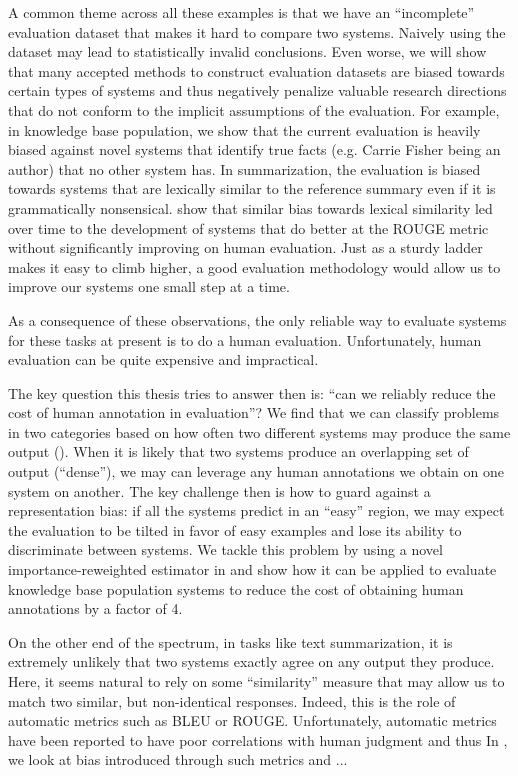 A common theme across all these examples is that we have an ``incomplete'' evaluation dataset that makes it hard to compare two systems.
Naively using the dataset may lead to statistically invalid conclusions.
Even worse, we will show that many accepted methods to construct evaluation datasets are biased towards certain types of systems and thus negatively penalize valuable research directions that do not conform to the implicit assumptions of the evaluation.
For example, in knowledge base population, we show that the current evaluation is heavily biased against novel systems that identify true facts (e.g. Carrie Fisher being an author) that no other system has.
In summarization, the evaluation is biased towards systems that are lexically similar to the reference summary even if it is grammatically nonsensical.
\citet{connor2010mind} show that similar bias towards lexical similarity led over time to the development of systems that do better at the ROUGE metric without significantly improving on human evaluation.
Just as a sturdy ladder makes it easy to climb higher, a good evaluation methodology would allow us to improve our systems one small step at a time.

As a consequence of these observations, the only reliable way to evaluate systems for these tasks at present is to do a human evaluation.
Unfortunately, human evaluation can be quite expensive and impractical.

The key question this thesis tries to answer then is: ``can we reliably reduce the cost of human annotation in evaluation''?
We find that we can classify problems in two categories based on how often two different systems may produce the same output ().
When it is likely that two systems produce an overlapping set of output (``dense''), we may can leverage any human annotations we obtain on one system on another.
The key challenge then is how to guard against a representation bias: if all the systems predict in an ``easy'' region, we may expect the evaluation to be tilted in favor of easy examples and lose its ability to discriminate between systems.
We tackle this problem by using a novel importance-reweighted estimator in  and show how it can be applied to evaluate knowledge base population systems to reduce the cost of obtaining human annotations by a factor of 4.

On the other end of the spectrum, in tasks like text summarization, it is extremely unlikely that two systems exactly agree on any output they produce.
Here, it seems natural to rely on some ``similarity'' measure that may allow us to match two similar, but non-identical responses.
Indeed, this is the role of automatic metrics such as BLEU or ROUGE.
Unfortunately, automatic metrics have been reported to have poor correlations with human judgment and thus 
In , we look at bias introduced through such metrics and ...

